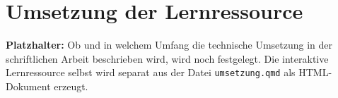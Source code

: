 
\chapter{Umsetzung der Lernressource}\label{umsetzung-der-lernressource}

\textbf{Platzhalter:} Ob und in welchem Umfang die technische Umsetzung
in der schriftlichen Arbeit beschrieben wird, wird noch festgelegt. Die
interaktive Lernressource selbst wird separat aus der Datei
\texttt{umsetzung.qmd} als HTML-Dokument erzeugt.
